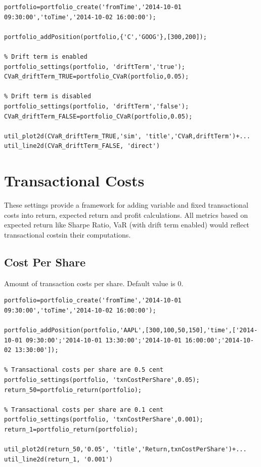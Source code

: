 \documentclass[letterpaper]{report}
\begin{document}
\begin{lstlisting}
portfolio=portfolio_create('fromTime','2014-10-01 09:30:00','toTime','2014-10-02 16:00:00');

portfolio_addPosition(portfolio,{'C','GOOG'},[300,200]);

% Drift term is enabled
portfolio_settings(portfolio, 'driftTerm','true');
CVaR_driftTerm_TRUE=portfolio_CVaR(portfolio,0.05);

% Drift term is disabled
portfolio_settings(portfolio, 'driftTerm','false');
CVaR_driftTerm_FALSE=portfolio_CVaR(portfolio,0.05);

util_plot2d(CVaR_driftTerm_TRUE,'sim', 'title','CVaR,driftTerm')+...
util_line2d(CVaR_driftTerm_FALSE, 'direct')
\end{lstlisting}

\section{Transactional Costs}
These settings provide a framework for adding variable and fixed transactional costs into return, expected return and profit calculations.
All metrics based on expected return like Sharpe Ratio, VaR (with drift term enabled) would reflect transactional costsin their computations.
\subsection{Cost Per Share}
Amount of transaction costs per share. Default value is 0.
\begin{lstlisting}
portfolio=portfolio_create('fromTime','2014-10-01 09:30:00','toTime','2014-10-02 16:00:00');

portfolio_addPosition(portfolio,'AAPL',[300,100,50,150],'time',['2014-10-01 09:30:00';'2014-10-01 13:30:00';'2014-10-01 16:00:00';'2014-10-02 13:30:00']);

% Transactional costs per share are 0.5 cent 
portfolio_settings(portfolio, 'txnCostPerShare',0.05);
return_50=portfolio_return(portfolio);

% Transactional costs per share are 0.1 cent 
portfolio_settings(portfolio, 'txnCostPerShare',0.001);
return_1=portfolio_return(portfolio);

util_plot2d(return_50,'0.05', 'title','Return,txnCostPerShare')+...
util_line2d(return_1, '0.001')
\end{lstlisting}
\end{document}
